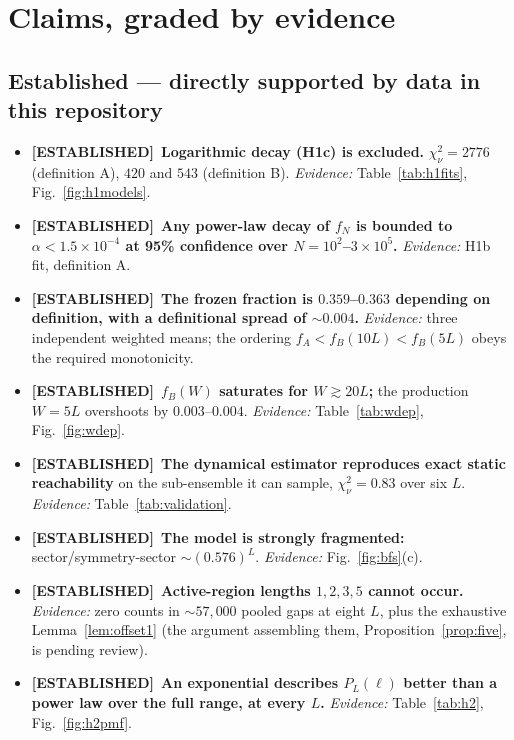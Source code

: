 \documentclass[11pt,a4paper]{article}
\newcommand{\Est}{\textcolor{estab}{\textbf{[ESTABLISHED]}}}
\begin{document}
\section{Claims, graded by evidence}

\subsection*{Established --- directly supported by data in this repository}
\begin{itemize}
\item \Est\ \textbf{Logarithmic decay (H1c) is excluded.}
$\chi^2_\nu=2776$ (definition A), $420$ and $543$ (definition B).
\emph{Evidence:} Table~\ref{tab:h1fits}, Fig.~\ref{fig:h1models}.
\item \Est\ \textbf{Any power-law decay of $f_N$ is bounded to
$\alpha<1.5\times10^{-4}$ at 95\% confidence over $N=10^2$--$3\times10^5$.}
\emph{Evidence:} H1b fit, definition A.
\item \Est\ \textbf{The frozen fraction is $0.359$--$0.363$ depending on
definition, with a definitional spread of ${\sim}0.004$.}
\emph{Evidence:} three independent weighted means; the ordering
$f_A<f_B(10L)<f_B(5L)$ obeys the required monotonicity.
\item \Est\ \textbf{$f_B(W)$ saturates for $W\gtrsim20L$;} the production
$W=5L$ overshoots by $0.003$--$0.004$.
\emph{Evidence:} Table~\ref{tab:wdep}, Fig.~\ref{fig:wdep}.
\item \Est\ \textbf{The dynamical estimator reproduces exact static
reachability} on the sub-ensemble it can sample, $\chi^2_\nu=0.83$ over six
$L$. \emph{Evidence:} Table~\ref{tab:validation}.
\item \Est\ \textbf{The model is strongly fragmented:} sector/symmetry-sector
$\sim(0.576)^L$. \emph{Evidence:} Fig.~\ref{fig:bfs}(c).
\item \Est\ \textbf{Active-region lengths $1,2,3,5$ cannot occur.}
\emph{Evidence:} zero counts in ${\sim}57{,}000$ pooled gaps at eight $L$,
plus the exhaustive Lemma~\ref{lem:offset1} (the argument assembling them,
Proposition~\ref{prop:five}, is pending review).
\item \Est\ \textbf{An exponential describes $P_L(\ell)$ better than a power
law over the full range, at every $L$.} \emph{Evidence:}
Table~\ref{tab:h2}, Fig.~\ref{fig:h2pmf}.
\end{itemize}
\end{document}
